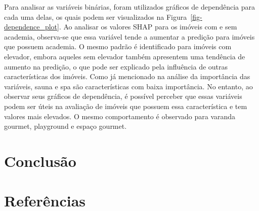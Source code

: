 \documentclass[
  12pt,
  a4paper,
]{scrreprt}
\begin{document}
\vspace{12pt}

Para analisar as variáveis binárias, foram utilizados gráficos de
dependência para cada uma delas, os quais podem ser visualizados na
Figura~\ref{fig-dependence_plot}. Ao analisar os valores SHAP para os
imóveis com e sem academia, observa-se que essa variável tende a
aumentar a predição para imóveis que possuem academia. O mesmo padrão é
identificado para imóveis com elevador, embora aqueles sem elevador
também apresentem uma tendência de aumento na predição, o que pode ser
explicado pela influência de outras características dos imóveis. Como já
mencionado na análise da importância das variáveis, sauna e spa são
características com baixa importância. No entanto, ao observar seus
gráficos de dependência, é possível perceber que essas variáveis podem
ser úteis na avaliação de imóveis que possuem essa característica e tem
valores mais elevados. O mesmo comportamento é observado para varanda
gourmet, playground e espaço gourmet.

\chapter{Conclusão}\label{conclusuxe3o}

\chapter*{\texorpdfstring{\centering Referências}{Referências}}\label{referuxeancias}

\end{document}

